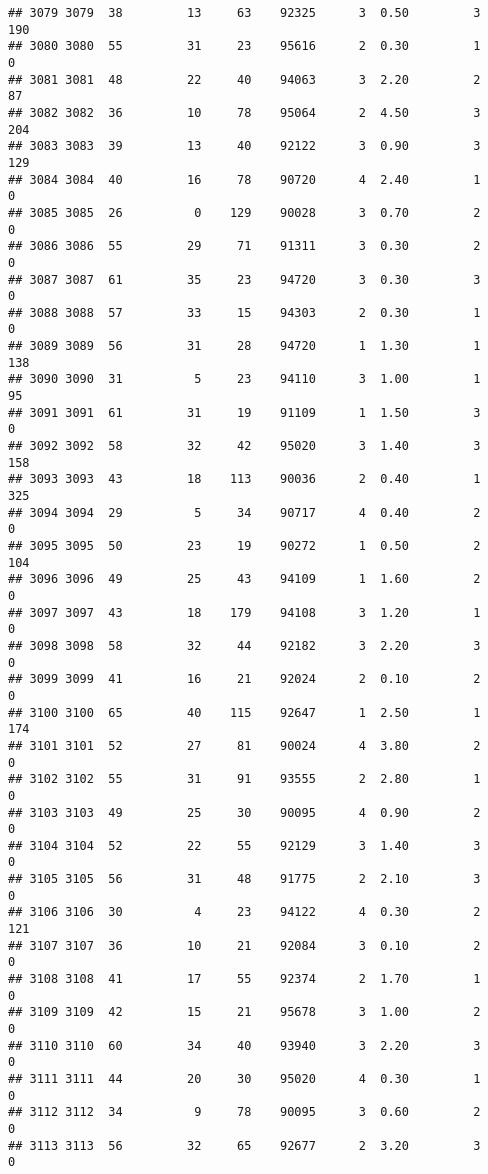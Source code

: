 \documentclass[
]{article}
\begin{document}
\begin{verbatim}
## 3079 3079  38         13     63    92325      3  0.50         3      190
## 3080 3080  55         31     23    95616      2  0.30         1        0
## 3081 3081  48         22     40    94063      3  2.20         2       87
## 3082 3082  36         10     78    95064      2  4.50         3      204
## 3083 3083  39         13     40    92122      3  0.90         3      129
## 3084 3084  40         16     78    90720      4  2.40         1        0
## 3085 3085  26          0    129    90028      3  0.70         2        0
## 3086 3086  55         29     71    91311      3  0.30         2        0
## 3087 3087  61         35     23    94720      3  0.30         3        0
## 3088 3088  57         33     15    94303      2  0.30         1        0
## 3089 3089  56         31     28    94720      1  1.30         1      138
## 3090 3090  31          5     23    94110      3  1.00         1       95
## 3091 3091  61         31     19    91109      1  1.50         3        0
## 3092 3092  58         32     42    95020      3  1.40         3      158
## 3093 3093  43         18    113    90036      2  0.40         1      325
## 3094 3094  29          5     34    90717      4  0.40         2        0
## 3095 3095  50         23     19    90272      1  0.50         2      104
## 3096 3096  49         25     43    94109      1  1.60         2        0
## 3097 3097  43         18    179    94108      3  1.20         1        0
## 3098 3098  58         32     44    92182      3  2.20         3        0
## 3099 3099  41         16     21    92024      2  0.10         2        0
## 3100 3100  65         40    115    92647      1  2.50         1      174
## 3101 3101  52         27     81    90024      4  3.80         2        0
## 3102 3102  55         31     91    93555      2  2.80         1        0
## 3103 3103  49         25     30    90095      4  0.90         2        0
## 3104 3104  52         22     55    92129      3  1.40         3        0
## 3105 3105  56         31     48    91775      2  2.10         3        0
## 3106 3106  30          4     23    94122      4  0.30         2      121
## 3107 3107  36         10     21    92084      3  0.10         2        0
## 3108 3108  41         17     55    92374      2  1.70         1        0
## 3109 3109  42         15     21    95678      3  1.00         2        0
## 3110 3110  60         34     40    93940      3  2.20         3        0
## 3111 3111  44         20     30    95020      4  0.30         1        0
## 3112 3112  34          9     78    90095      3  0.60         2        0
## 3113 3113  56         32     65    92677      2  3.20         3        0

\end{verbatim}
\end{document}
